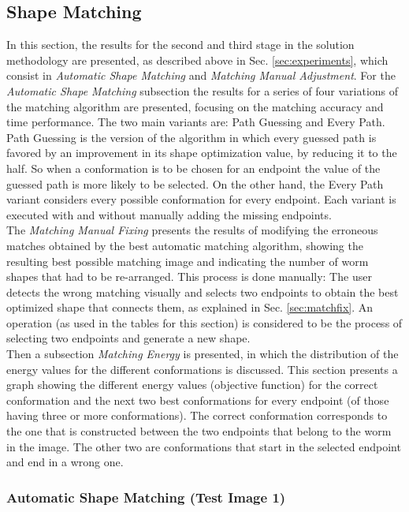 \subsection{Shape Matching}

In this section, the results for the second and third stage in the 
solution methodology are presented, as described above in Sec. \ref{sec:experiments}, which consist
in \emph{Automatic Shape Matching} and \emph{Matching Manual Adjustment}. 
For the \emph{Automatic Shape Matching} subsection the results for a series of four 
variations of the matching algorithm are presented, focusing on the matching accuracy 
and time performance. The two main variants are: Path Guessing and Every Path. 
Path Guessing is the version of the algorithm in which every guessed path is favored
by an improvement in its shape optimization value, by reducing it to the half. So when 
a conformation is to be chosen for an endpoint the value of the guessed path is more likely
to be selected. On the other hand, the Every Path variant considers every possible conformation for every endpoint.
Each variant is executed with and without manually adding the missing endpoints.\\

The \emph{Matching Manual Fixing} presents the results of modifying the erroneous matches
obtained by the best automatic matching algorithm, showing the resulting best
possible matching image and indicating the number of worm shapes that had to be 
re-arranged. This process is done manually: The user detects the wrong matching visually 
and selects two endpoints to obtain the best optimized shape that connects them, as
explained in Sec. \ref{sec:matchfix}. An operation (as used in the tables for this section) 
is considered to be the process of selecting two endpoints and generate a new shape.\\

Then a subsection \emph{Matching Energy} is presented, in which the distribution of
the energy values for the different conformations is discussed. This section presents
a graph showing the different energy values (objective function) for the correct conformation
and the next two best conformations for every endpoint (of those having three or more conformations). 
The correct conformation corresponds to the one that is constructed between the two endpoints that
belong to the worm in the image. The other two are conformations that start in the
selected endpoint and end in a wrong one.


\subsubsection*{Automatic Shape Matching (Test Image 1)}

